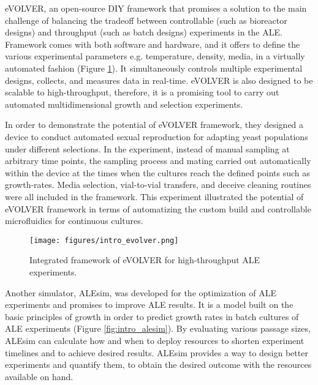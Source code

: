 eVOLVER\cite{wong2018precise}, an open-source DIY framework that promises a solution to the main challenge of balancing the tradeoff between controllable (such as bioreactor designs) and throughput (such as batch designs) experiments in the ALE. Framework comes with both software and hardware, and it offers to define the various experimental parameters e.g. temperature, density, media, in a virtually automated fashion (Figure \ref{fig:intro_evolver}). It simultaneously controls multiple experimental designs, collects, and measures data in real-time. eVOLVER is also designed to be scalable to high-throughput, therefore, it is a promising tool to carry out automated multidimensional growth and selection experiments.

In order to demonstrate the potential of eVOLVER framework, they designed a device to conduct automated sexual reproduction for adapting yeast populations under different selections. In the experiment, instead of manual sampling at arbitrary time points, the sampling process and mating carried out automatically within the device at the times when the cultures reach the defined points such as growth-rates. Media selection, vial-to-vial transfers, and deceive cleaning routines were all included in the framework. This experiment illustrated the potential of eVOLVER framework in terms of automatizing the custom build and controllable microfluidics for continuous cultures.


\begin{figure}[H]
\begin{center}
\texttt{[image: figures/intro\_evolver.png]}
\caption[Integrated framework of eVOLVER for high-throughput ALE experiments]{Integrated framework of eVOLVER for high-throughput ALE experiments.}
\label{fig:intro_evolver}
\end{center}
\end{figure}


Another simulator, ALEsim\cite{lacroix2017model}, was developed for the optimization of ALE experiments and promises to improve ALE results. It is a model built on the basic principles of growth in order to predict growth rates in batch cultures of ALE experiments (Figure \ref{fig:intro_alesim}). By evaluating various passage sizes, ALEsim can calculate how and when to deploy resources to shorten experiment timelines and to achieve desired results. ALEsim provides a way to design better experiments and quantify them, to obtain the desired outcome with the resources available on hand.

